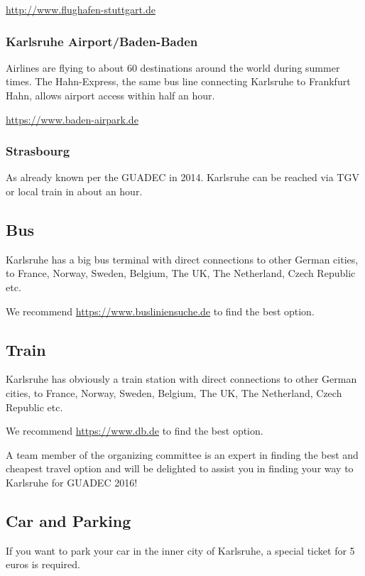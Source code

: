 \url{http://www.flughafen-stuttgart.de}

\subsubsection{Karlsruhe Airport/Baden-Baden}

Airlines are flying to about 60 destinations around the world during summer times. The Hahn-Express, the same bus line connecting Karlsruhe to Frankfurt Hahn, allows airport access within half an hour.
 
\url{https://www.baden-airpark.de}

\subsubsection{Strasbourg}

As already known per the GUADEC in 2014.
Karlsruhe can be reached via TGV or local train in about an hour.


\subsection{Bus}

Karlsruhe has a big bus terminal with direct connections to other German cities, to France, Norway, Sweden, Belgium, The UK, The Netherland, Czech Republic etc.

We recommend \url{https://www.busliniensuche.de} to find the best option.

\subsection{Train}

Karlsruhe has obviously a train station with direct connections to other German cities, to France, Norway, Sweden, Belgium, The UK, The Netherland, Czech Republic etc.

We recommend \url{https://www.db.de} to find the best option.

A team member of the organizing committee is an expert in finding the best and cheapest travel option and will be delighted to assist you in finding your way to Karlsruhe for GUADEC 2016!

\subsection{Car and Parking}

If you want to park your car in the inner city of Karlsruhe, a special ticket for 5 euros is required. 

